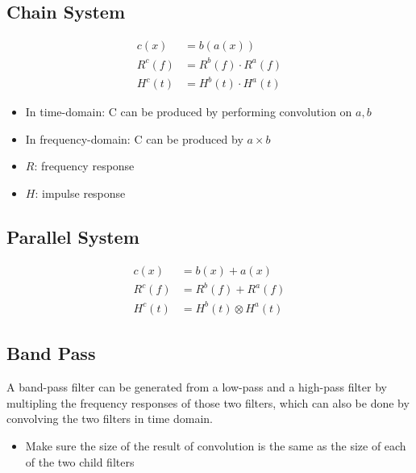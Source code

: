   \subsection{Chain System}

    \begin{align}
      c\left( x \right) &= b \left( a\left( x\right) \right) \\
      R^{c}\left( f \right) &= R^{b}\left( f \right) \cdot R^{a}\left( f \right) \\
      H^{c}\left( t \right) &= H^{b}\left( t \right) \cdot H^{a}\left( t \right)
    \end{align}

    \begin{itemize}
      \item In time-domain: C can be produced by performing convolution on
      $ a, b $
      \item In frequency-domain: C can be produced by $ a \times b $
      \item $ R $: frequency response
      \item $ H $: impulse response
    \end{itemize}

  \subsection{Parallel System}

    \begin{align}
      c\left( x \right) &= b \left( x \right) + a\left( x\right) \\
      R^{c}\left( f \right) &= R^{b}\left( f \right) + R^{a}\left( f \right) \\
      H^{c}\left( t \right) &= H^{b}\left( t \right) \otimes H^{a}\left( t \right)
    \end{align}

  \subsection{Band Pass}

    A band-pass filter can be generated from a low-pass and a high-pass filter
    by multipling the frequency responses of those two filters,
    which can also be done by convolving the two filters in time domain.

    \begin{itemize}
      \item Make sure the size of the result of convolution is the same as
      the size of each of the two child filters
    \end{itemize}

